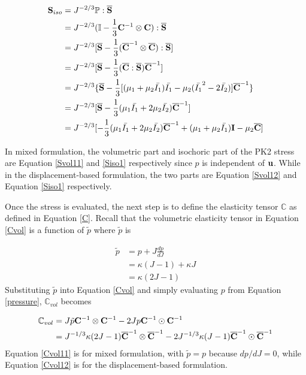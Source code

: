 \begin{equation} \label{Siso1}
\begin{split}
\bold{S}_{iso}
&= J^{-2/3}\mathbb{P}:\overline{\bold{S}} \\
&= J^{-2/3}( \mathbb{I} - \frac{1}{3}\bold{C}^{-1} \otimes \bold{C} ) : \overline{\bold{S}} \\
&= J^{-2/3} [\overline{\bold{S}} - \frac{1}{3}( \overline{\bold{C}}^{-1} \otimes \overline{\bold{C}} ) : \overline{\bold{S}} ]  \\
&= J^{-2/3}[ \overline{\bold{S}} - \frac{1}{3}(\overline{\bold{C}} : \overline{\bold{S}})\overline{\bold{C}}^{-1} ]  \\
&= J^{-2/3}\{ \overline{\bold{S}} - \frac{1}{3} [(\mu_1+\mu_2\bar{I_1})\bar{I_1} - \mu_2(\bar{I_1}^2-2\bar{I_2})]\overline{\bold{C}}^{-1} \} \\
&= J^{-2/3}[\overline{\bold{S}} -  \frac{1}{3}(\mu_1\bar{I_1} + 2\mu_2\bar{I_2}) \overline{\bold{C}}^{-1}] \\
&= J^{-2/3} [    - \frac{1}{3}(\mu_1\bar{I_1} + 2\mu_2\bar{I_2}) \overline{\bold{C}}^{-1}  + (\mu_1 + \mu_2\bar{I_1})\bold{I} - \mu_2\overline{\bold{C}} ]
\end{split}
\end{equation}

In mixed formulation, the volumetric part and isochoric part of the PK2 stress are Equation \ref{Svol11} and \ref{Siso1} respectively since $p$ is independent of $\bold{u}$. While in the displacement-based formulation, the two parts are Equation \ref{Svol12} and Equation \ref{Siso1} respectively.

Once the stress is evaluated, the next step is to define the elasticity tensor $\mathbb{C}$ as defined in Equation \ref{C}. Recall that the volumetric elasticity tensor in Equation \ref{Cvol} is a function of $\tilde{p}$ where $\tilde{p}$ is

\begin{equation}
\begin{split}
\tilde{p} &= p + J\frac{dp}{dJ} \\
             &= \kappa(J-1) + \kappa{J} \\
             &= \kappa{(2J - 1)}
\end{split}
\end{equation}
Substituting $\tilde{p}$ into Equation \ref{Cvol} and simply evaluating $p$ from Equation \ref{pressure}, $\mathbb{C}_{vol}$ becomes

\begin{subequations} \label{Cvol1}
\begin{align}
\mathbb{C}_{vol} &= J\tilde{p}\bold{C}^{-1}\otimes\bold{C}^{-1} - 2Jp\bold{C}^{-1}\odot\bold{C}^{-1} \label{Cvol11} \\
&=  J^{-1/3}\kappa{(2J-1)} \overline{\bold{C}}^{-1} \otimes \overline{\bold{C}}^{-1} - 2J^{-1/3}\kappa{(J-1)} \overline{\bold{C}}^{-1} \odot \overline{\bold{C}}^{-1} \label{Cvol12}
\end{align}
\end{subequations} 
Equation \ref{Cvol11} is for mixed formulation, with $\tilde{p} = p$ because $dp/dJ = 0$, while Equation \ref{Cvol12} is for the displacement-based formulation.

